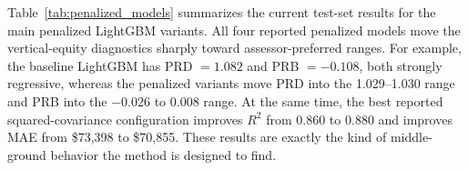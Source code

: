 \documentclass[12pt, draft]{article}
\theoremstyle{plain}
\theoremstyle{definition}
\newcommand{\1}{\mathbf{1}}
\begin{document}
Table~\ref{tab:penalized_models} summarizes the current test-set results for the main penalized LightGBM variants. All four reported penalized models move the vertical-equity diagnostics sharply toward assessor-preferred ranges. For example, the baseline LightGBM has PRD \(=1.082\) and PRB \(=-0.108\), both strongly regressive, whereas the penalized variants move PRD into the 1.029--1.030 range and PRB into the \(-0.026\) to \(0.008\) range. At the same time, the best reported squared-covariance configuration improves \(R^2\) from \(0.860\) to \(0.880\) and improves MAE from \$73{,}398 to \$70{,}855. These results are exactly the kind of middle-ground behavior the method is designed to find.



\end{document}
